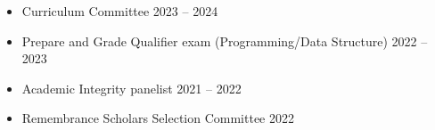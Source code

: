   \begin{itemize}
    \item Curriculum Committee \hfill 2023 -- 2024
    \item Prepare and Grade Qualifier exam (Programming/Data Structure) \hfill 2022 -- 2023
    \item Academic Integrity panelist \hfill 2021 -- 2022
    \item Remembrance Scholars Selection Committee \hfill 2022
  \end{itemize}